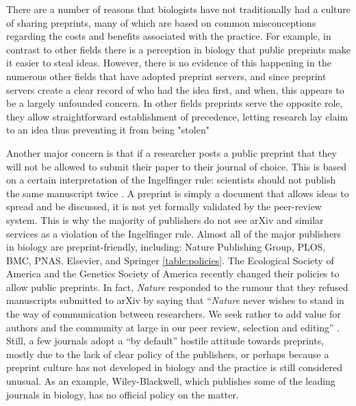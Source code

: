 \documentclass[letterpaper,twocolumn,superscriptaddress,showkeys,longbibliography]{revtex4-1}
\begin{document}
There are a number of reasons that biologists have not traditionally had a
culture of sharing preprints, many of which are based on common misconceptions
regarding the costs and benefits associated with the practice. For example, in contrast
to other fields there is a perception in biology that public preprints
make it easier to steal ideas. However, there is no evidence of this happening
in the numerous other fields that have adopted preprint servers, and since preprint
servers create a clear record of who had the idea first, and when, this
appears to be a largely unfounded concern. In other fields preprints serve the
opposite role, they allow straightforward establishment of precedence, letting
research lay claim to an idea thus preventing it from being "stolen" \cite{gin11}

Another major concern is that if a researcher posts a public preprint that they
will not be allowed to submit their paper to their journal of choice.  This is
based on a certain interpretation of the Ingelfinger rule: scientists should not
publish the same manuscript twice \cite{alt96}. A preprint is simply a document
that allows ideas to spread and be discussed, it is not yet formally validated
by the peer-review system. This is why the majority of publishers do not see
arXiv and similar services as a violation of the Ingelfinger rule. Almost all of
the major publishers in biology are preprint-friendly, including: Nature
Publishing Group, PLOS, BMC, PNAS, Elsevier, and Springer \ref{table:policies}.
The Ecological Society of America and the Genetics Society of America recently
changed their policies to allow public preprints. In fact, \emph{Nature}
responded to the rumour that they refused manuscripts submitted to arXiv by
saying that ``\emph{Nature} never wishes to stand in the way of communication
between researchers. We seek rather to add value for authors and the community
at large in our peer review, selection and editing'' \cite{nat05}.  Still, a few
journals adopt a ``by default'' hostile attitude towards preprints, mostly due
to the lack of clear policy of the publishers, or perhaps because a preprint
culture has not developed in biology and the practice is still considered
unusual. As an example, Wiley-Blackwell, which publishes some of the leading
journals in biology, has no official policy on the matter.
\end{document}
